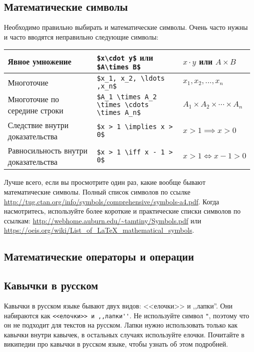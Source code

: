 \documentclass{article}
\begin{document}
    \subsection{Математические символы}
    Необходимо правильно выбирать и математические символы. Очень часто нужны и часто вводятся неправильно следующие символы:
    \begin{table}[H]
        \begin{tabular}{|p{} | l  | l |}
            \hline
            Явное умножение               & \verb|$x\cdot y$| или \verb|$A\times B$|         & $x\cdot y$ или $A\times B$                \\
            \hline
            Многоточие                    & \verb|$x_1, x_2, \ldots ,x_n$|                   & $x_1, x_2, \ldots ,x_n$                   \\
            \hline
            Многоточие по середине строки & \verb|$A_1 \times A_2 \times \cdots \times A_n$| & $A_1 \times A_2 \times \cdots \times A_n$ \\
            \hline
            Следствие внутри доказательства & \verb|$x > 1 \implies x > 0$| & $x > 1 \implies x > 0$ \\
            \hline
            Равносильность внутри доказательства & \verb|$x > 1 \iff x - 1 > 0$| & $x > 1 \iff x - 1 > 0$ \\
            \hline
        \end{tabular}
    \end{table}

    Лучше всего, если вы просмотрите один раз, какие вообще бывают математические символы. Полный список символов
    по ссылке \url{http://tug.ctan.org/info/symbols/comprehensive/symbols-a4.pdf}.
    Когда насмотритесь, используйте более короткие и практические списки символов по ссылкам:
    \url{http://webhome.auburn.edu/~tamtiny/Symbols.pdf} или \url{https://oeis.org/wiki/List_of_LaTeX_mathematical_symbols}.

    \subsection{Математические операторы и операции}



    \subsection{Кавычки в русском}

    Кавычки в русском языке бывают двух видов: <<елочки>> и ,,лапки''. Они набираются как
    \verb|<<елочки>> и ,,лапки''|. Не используйте символ \verb|"|, поэтому что он не подходит
    для текстов на русском. Лапки нужно использовать только как кавычки внутри кавычек, в остальных случаях
    используйте елочки. Почитайте в википедии про кавычки в русском языке, чтобы узнать об этом подробней.
\end{document}
